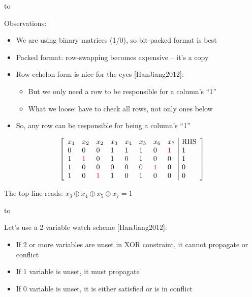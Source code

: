 \documentclass[aspectratio=196]{slides}
\def\TITLE#1{\hbox to \linewidth{\large #1\hfill}}
\def\BOTTOM{\vfill\newpage}
\def\SLIDE#1{\BOTTOM\TITLE{#1}}
\begin{document}
\SLIDE{CDCL(T) Gauss-Jordan Elimination: None of that row swapping please!}
\vspace{2ex}

Observations:
\begin{itemize}
\item We are using binary matrices (1/0), so bit-packed format is best
\item Packed format: row-swapping becomes expensive -- it's a copy
\item Row-echelon form is nice for the eyes [HanJiang2012]:
\begin{itemize}
\item But we only need a row to be responsible for a column's ``1''
\item What we loose: have to check all rows, not only ones below
\end{itemize}
\item So, any row can be responsible for being a column's ``1''
\end{itemize}

\begin{center}
\begin{minipage}{0.2\linewidth}
\[
\left[
\begin{array}{llllllll|l}
x_1 & x_2 & x_2 & x_3 & x_4 & x_5 & x_6 & x_7 & $RHS$\\
0 & 0 & 0 & 1 & 1 & 1 & 0 & \color{red}1 & 1\\
1 & \color{red}1 & 0 & 1 & 0 & 1 & 0 & 0 & 1\\
1 &0 &0 & 0 & 0 & 0 & \color{red}1 & 0 & 0\\
1 &0 &\color{red}1 & 1 & 0 & 1 & 0 & 0 & 0\\
\end{array}
\right]
\]
\end{minipage}
\end{center}

The top line reads: $x_3 \oplus x_4 \oplus x_5 \oplus x_7 = 1$



\vfill
\newpage
\SLIDE{CDCL(T) Gauss-Jordan Elimination: 2-variable watchlist scheme}
\vspace{2ex}

Let's use a 2-variable watch scheme [HanJiang2012]:
\begin{itemize}
\item If 2 or more variables are unset in XOR constraint, it cannot propagate or conflict
\item If 1 variable is unset, it must propagate
\item If 0 variable is unset, it is either satisfied or is in conflict
\end{itemize}
\end{document}
